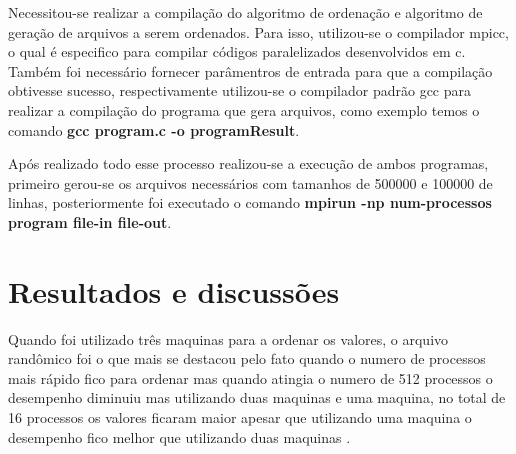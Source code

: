 \documentclass[12pt]{article}
\begin{document}
Necessitou-se realizar a compilação do algoritmo de ordenação e algoritmo de geração de arquivos a serem ordenados. Para isso, utilizou-se o compilador mpicc, o qual é especifico para compilar códigos paralelizados desenvolvidos em c. Também foi necessário fornecer parâmentros de entrada para que a compilação obtivesse sucesso, respectivamente utilizou-se o compilador padrão gcc para realizar a compilação do programa que gera arquivos, como exemplo temos o comando \textbf{gcc program.c -o programResult}.

\newpage

Após realizado todo esse processo realizou-se a execução de ambos programas, primeiro gerou-se os arquivos necessários com tamanhos de 500000 e 100000 de linhas, posteriormente foi executado o comando \textbf{mpirun -np num-processos program file-in file-out}.


\section{Resultados e discussões}

Quando foi utilizado três maquinas para a ordenar os valores, o arquivo randômico foi o que mais se destacou pelo fato quando o numero de processos  mais rápido fico para ordenar mas quando atingia o numero de 512 processos o desempenho diminuiu mas utilizando duas maquinas e uma maquina, no total de 16 processos os valores ficaram maior apesar que utilizando uma maquina o desempenho fico melhor que utilizando duas maquinas .
\end{document}
